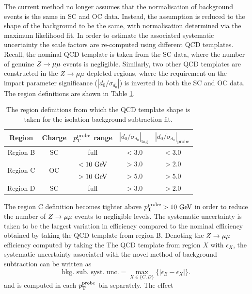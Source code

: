 The current method no longer assumes that the normalisation of background
events is the same in SC and OC data. Instead, the assumption is reduced
to the shape of the background to be the same, with normalisation 
determined via the maximum likelihood fit. In order to estimate the associated systematic
uncertainty the scale factors are re-computed using different QCD templates.
Recall, the nominal QCD template is taken from the SC data, where the number of
genuine $Z \rightarrow \mu\mu$ events is negligible. Similarly, two other QCD templates are
constructed in the $Z \rightarrow \mu\mu$ depleted regions, where the requirement on the
impact parameter significance ($|d_0/\sigma_{d_0}|$) is inverted in both
the SC and OC data. The region definitions are shown in Table \ref{tab:muon:reg}.
\begin{table}[h]
\centering
\caption{The region definitions from which the QCD template shape is taken
for the isolation background subtraction fit.}
\label{tab:muon:reg}
\begin{tabular}{c c c c c}
\toprule
\midrule
Region   & Charge & $p_{\text{T}}^\text{probe}$ range & $|d_0/\sigma_{d_0}|_\text{tag}$ & $|d_0/\sigma_{d_0}|_\text{probe}$ \\
\midrule
Region B & SC & full & $< 3.0$ & $ < 3.0$ \\
\midrule
\multirow{2}{*}{Region C} &  \multirow{2}{*}{OC} & $ < 10~\text{Ge\kern -0.1em V}$ & $ > 3.0$ & $ > 2.0$ \\
                          &                      & $ > 10~\text{Ge\kern -0.1em V}$ & $ > 5.0$ & $ > 5.0$ \\
\midrule
Region D & SC & full & $ > 3.0$ & $ > 2.0$ \\
\midrule
\bottomrule
\end{tabular}
\end{table}
The region C definition becomes tighter above $p_{\text{T}}^\text{probe} > 10~\text{Ge\kern -0.1em V}$
in order to reduce the number of $Z \rightarrow \mu\mu$ events to negligible levels. The
systematic uncertainty is taken to be the largest variation in efficiency
compared to the nominal efficiency obtained by taking the QCD template
from region B. Denoting the $Z \rightarrow \mu\mu$ efficiency computed by taking the
The QCD template from region $X$ with $\epsilon_X$, the systematic
uncertainty associated with the novel method of background subtraction
can be written as
\begin{equation}
\label{eq:muon:unc}
\text{bkg. sub. syst. unc.} = \max_{X \in \{C, D\}} \{ \vert \epsilon_B - \epsilon_X\vert \}.
\end{equation}
and is computed in each $p_{\text{T}}^\text{probe}$ bin separately. The effect
